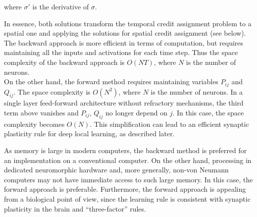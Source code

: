 \documentclass[journal,onecolumn,11pt]{IEEEtran}
\begin{document}
\begin{enumerate}
where $\sigma'$ is the derivative of $\sigma$.
\end{enumerate}


In essence, both solutions transform the temporal credit assignment problem to a spatial one and applying the solutions for spatial credit assignment (see below).
The backward approach is more efficient in terms of computation, but requires maintaining all the inputs and activations for each time step.
Thus the space complexity of the backward approach is $O(N T)$, where $N$ is the number of neurons.\\
On the other hand, the forward method requires maintaining variables $P_{ij}$ and $Q_{ij}$.
The space complexity is $O(N^2)$, where $N$ is the number of neurons.
In a single layer feed-forward architecture without refractory mechanisms, the third term above vanishes and $P_{ij}$, $Q_{ij}$ no longer depend on $j$.
In this case, the space complexity becomes $O(N)$.
This simplification can lead to an efficient synaptic plasticity rule for deep local learning, as described later.

As memory is large in modern computers, the backward method is preferred for an implementation on a conventional computer.
On the other hand, processing in dedicated neuromorphic hardware and, more generally, non-von Neumann computers may not have immediate access to such large memory.
In this case, the forward approach is preferable.
Furthermore, the forward approach is appealing from a biological point of view, since the learning rule is consistent with synaptic plasticity in the brain and ``three-factor'' rules.

\end{document}
